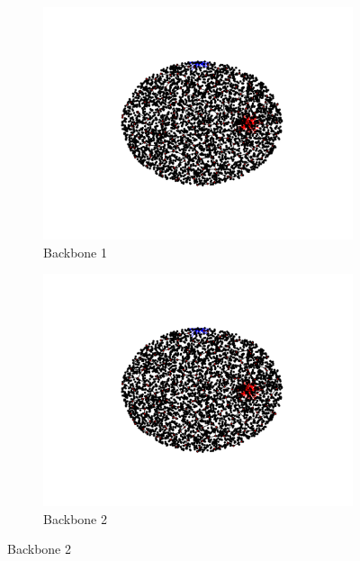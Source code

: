 \documentclass[oneside, titlepage]{scrartcl}
\begin{document}
\begin{figure}[!h]
\begin{subfigure}{0.5\textwidth}
	\centering
	\includegraphics[width=0.9\linewidth]{figures/simplegraph7.pdf}
	\caption{Backbone 1}
\end{subfigure}%
\begin{subfigure}{0.5\textwidth}
	\centering
	\includegraphics[width=0.9\linewidth]{figures/simplegraph71.pdf}
	\caption{Backbone 2}
\end{subfigure}
\end{figure}
\end{document}
